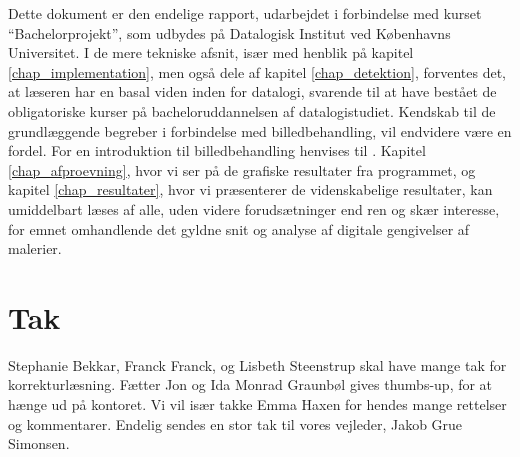 {
{\sffamily Dette dokument er den endelige rapport, udarbejdet i
forbindelse med kurset ``Bachelorprojekt'', som udbydes på Datalogisk
Institut ved Københavns Universitet. I de mere tekniske afsnit, især med
henblik på kapitel \ref{chap_implementation}, men også dele af kapitel
\ref{chap_detektion}, forventes det, at læseren har en basal viden inden
for datalogi, svarende til at have bestået de obligatoriske kurser på
bacheloruddannelsen af datalogistudiet\cite{DIKUkurser}. Kendskab til de
grundlæggende begreber i forbindelse med billedbehandling, vil endvidere
være en fordel. For en introduktion til billedbehandling henvises til
\cite{SIOlsen}. Kapitel \ref{chap_afproevning}, hvor vi ser på de
grafiske resultater fra programmet, og kapitel \ref{chap_resultater},
hvor vi præsenterer de videnskabelige resultater, kan umiddelbart læses
af alle, uden videre forudsætninger end ren og skær interesse, for emnet
omhandlende det gyldne snit og analyse af digitale gengivelser af
malerier.

\section*{Tak}
Stephanie Bekkar, Franck Franck, og Lisbeth Steenstrup skal have mange
tak for korrekturlæsning. Fætter Jon og Ida Monrad Graunbøl gives
thumbs-up, for at hænge ud på kontoret. Vi vil især takke Emma Haxen for
hendes mange rettelser og kommentarer. Endelig sendes en stor tak til
vores vejleder, Jakob Grue Simonsen.
}
}

